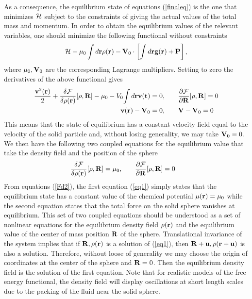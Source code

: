 \documentclass[b5paper,openright,10pt]{book}
\begin{document}
As a consequence, the equilibrium state of equations (\ref{finaleq}) is the
one that minimizes ${\cal H}$ subject to the constraints of giving the
actual values of the total mass  and momentum.  In order to obtain the
equilibrium values of  the relevant variables, one  should minimize the
following functional without constraints
\begin{align}
  {\cal H}-\mu_0\int d{\bf r} \rho({\bf r})-{\bf V}_0\cdot\left[\int d{\bf r}{\bf g}({\bf r})+{\bf P}\right],
\end{align}
where    $\mu_0,{\bf   V}_0$    are    the   corresponding    Lagrange
multipliers. Setting  to zero the derivatives of  the above functional
gives  
\begin{align}
  \frac{{\bf v}^2({\bf r})}{2}
  +\frac{\delta {\cal F}}{\delta\rho({\bf r})}[\rho,{\bf R}]-\mu_0-V_0{\int d{\bf r}\bf v(t)}  &=0,\quad
&&\frac{\partial {\cal F}}{\partial {\bf R}}[\rho,{\bf R}]=0
\nonumber\\
{\bf v}({\bf r})-{\bf V}_0&=0,\quad
&&{\bf V}-{\bf V}_0=0
\label{eq01}
\end{align}
This means that the state of equilibrium has a constant velocity field
equal  to the  velocity  of  the solid  particle  and, without  losing
generality, we may take ${\bf V}_0=0$.  We then have the following two
coupled  equations for  the equilibrium  value that  take the  density
field and the position of the sphere
\begin{align}
\frac{\delta {\cal F}}{\delta\rho({\bf r})}[\rho,{\bf R}]&=\mu_0,\quad
&&
\frac{\partial {\cal F}}{\partial {\bf R}}[\rho,{\bf R}]=0
\label{eq1}
\end{align}
From equations   (\ref{Fd2}), the first equation  (\ref{eq1}) simply states
that  the equilibrium  state  has  a constant  value  of the  chemical
potential $\mu({\bf  r})=\mu_0$ while the second  equation states that
the total force on the solid  sphere vanishes at equilibrium. This set
of two  coupled equations should be  understood as a set  of nonlinear
equations for  the equilibrium density  field $\rho({\bf r})$  and the
equilibrium value of the center  of mass position ${\bf R}$ of the sphere.  Translational
invariance of the system implies that  if ${\bf R},\rho({\bf r})$ is a
solution of (\ref{eq1}), then  ${\bf R}+{\bf u},\rho({\bf r}+{\bf u})$
is also  a solution.   Therefore, without loose  of generality  we may
choose the origin of coordinates at the center of the sphere and ${\bf
  R}=0$. Then  the equilibrium  density field is  the solution  of the
first equation.   Note that  for realistic models  of the  free energy
functional,  the  density field  will  display  oscillations at  short
length scales due  to the packing of the fluid  near the solid sphere.
\end{document}
